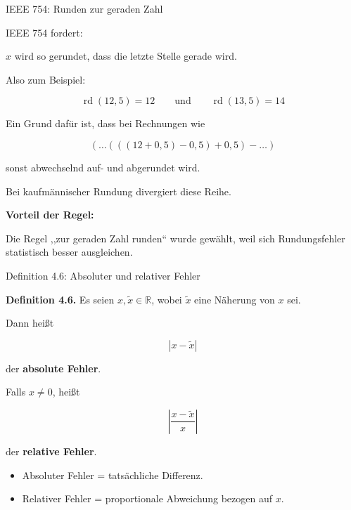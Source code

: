 \documentclass{beamer}
\begin{document}
\begin{frame}{IEEE 754: Runden zur geraden Zahl}

\small

IEEE 754 fordert:

\begin{center}
$x$ wird so gerundet, dass die letzte Stelle gerade wird.
\end{center}

\vspace{0.2cm}

Also zum Beispiel:

\[
\operatorname{rd}(12{,}5)=12
\qquad\text{und}\qquad
\operatorname{rd}(13{,}5)=14
\]

\vspace{0.5cm}

Ein Grund dafür ist, dass bei Rechnungen wie

\[
(\dots(((12+0{,}5)-0{,}5)+0{,}5)-\dots)
\]

sonst abwechselnd auf- und abgerundet wird.

\vspace{0.2cm}

Bei kaufmännischer Rundung divergiert diese Reihe.

\vspace{0.5cm}

\textbf{Vorteil der Regel:}

Die Regel ,,zur geraden Zahl runden`` wurde gewählt, weil sich Rundungsfehler statistisch besser ausgleichen.

\end{frame}

\begin{frame}{Definition 4.6: Absoluter und relativer Fehler}

\small

\textbf{Definition 4.6.}
Es seien \(x,\tilde{x}\in\mathbb{R}\), wobei \(\tilde{x}\) eine Näherung von \(x\) sei.

\vspace{0.5cm}

Dann heißt

\[
|x-\tilde{x}|
\]

der \textbf{absolute Fehler}.

\vspace{0.6cm}

Falls \(x\neq 0\), heißt

\[
\left|\frac{x-\tilde{x}}{x}\right|
\]

der \textbf{relative Fehler}.

\vspace{0.5cm}

\begin{itemize}
\item Absoluter Fehler = tatsächliche Differenz.
\item Relativer Fehler = proportionale Abweichung bezogen auf \(x\).
\end{itemize}

\end{frame}
\end{document}
